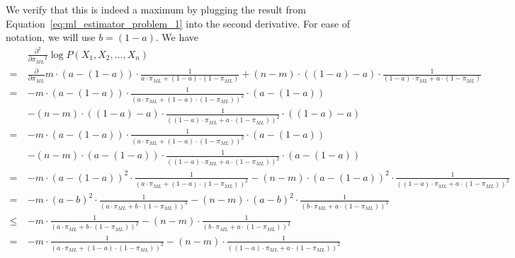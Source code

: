 We verify that this is indeed a maximum by plugging the result from Equation~\ref{eq:ml_estimator_problem_1} into the second derivative. 
For ease of notation, we will use $b = (1-a)$. We have
{
\allowdisplaybreaks
\begin{align*}
    &\frac{\partial^2}{\partial {\pi_{ML}}^2} \log P(X_1, X_2, \dots, X_n)\\
    =\ & \frac{\partial}{\partial {\pi_{ML}}} m \cdot (a - (1-a)) \cdot \frac{1}{a \cdot \pi_{ML} + (1-a) \cdot (1-\pi_{ML})}
    + (n - m) \cdot ((1-a) - a) \cdot \frac{1}{(1-a) \cdot \pi_{ML} + a \cdot (1-\pi_{ML})} \\
    =\ & -m \cdot (a - (1-a)) \cdot \frac{1}{\left( a \cdot \pi_{ML} + (1-a) \cdot (1-\pi_{ML}) \right)^2} \cdot \left( a - (1-a) \right) \\
    &- (n - m) \cdot ((1-a) - a) \cdot \frac{1}{\left( (1-a) \cdot \pi_{ML} + a \cdot (1-\pi_{ML}) \right)^2} \cdot \left( (1-a) -a \right) \\
    =\ & -m \cdot (a - (1-a)) \cdot \frac{1}{\left( a \cdot \pi_{ML} + (1-a) \cdot (1-\pi_{ML}) \right)^2} \cdot \left( a - (1-a) \right) \\
    &- (n - m) \cdot (a-(1-a)) \cdot \frac{1}{\left( (1-a) \cdot \pi_{ML} + a \cdot (1-\pi_{ML}) \right)^2} \cdot \left( a - (1-a) \right) \\
    =\ & - m \cdot {(a - (1-a))}^2 \cdot \frac{1}{\left( a \cdot \pi_{ML} + (1-a) \cdot (1-\pi_{ML}) \right)^2} - (n - m) \cdot {(a-(1-a))}^2 \cdot \frac{1}{\left( (1-a) \cdot \pi_{ML} + a \cdot (1-\pi_{ML}) \right)^2} \\
    =\ & -m \cdot {(a - b)}^2 \cdot \frac{1}{\left( a \cdot \pi_{ML} + b \cdot (1-\pi_{ML}) \right)^2} - (n - m) \cdot {(a-b)}^2 \cdot \frac{1}{\left( b \cdot \pi_{ML} + a \cdot (1-\pi_{ML}) \right)^2} \\
    \leq \ & - m \cdot \frac{1}{\left( a \cdot \pi_{ML} + b \cdot (1-\pi_{ML}) \right)^2} - (n - m) \cdot \frac{1}{\left( b \cdot \pi_{ML} + a \cdot (1-\pi_{ML}) \right)^2} \\
    = \ & - m \cdot \frac{1}{\left( a \cdot \pi_{ML} + (1-a) \cdot (1-\pi_{ML}) \right)^2} - (n - m) \cdot \frac{1}{\left( (1-a) \cdot \pi_{ML} + a \cdot (1-\pi_{ML}) \right)^2} \\

\end{align*}}
